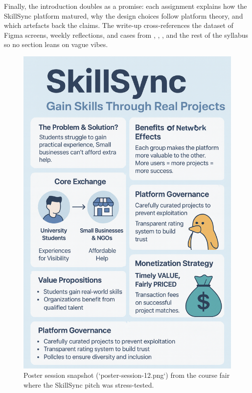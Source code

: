 \documentclass[12pt,a4paper]{article}
\begin{document}
Finally, the introduction doubles as a promise: each assignment explains how the SkillSync platform matured, why the design choices follow platform theory, and which artefacts back the claims. The write-up cross-references the dataset of Figma screens, weekly reflections, and cases from \citet{Choudary2016}, \citet{Srnicek2017}, \citet{Reillier2017}, and the rest of the syllabus so no section leans on vague vibes.

\begin{figure}[h]
  \centering
  \includegraphics[width=0.7\linewidth]{figures/poster-session-12.png}
  \caption{Poster session snapshot (`poster-session-12.png`) from the course fair where the SkillSync pitch was stress-tested.}
  \label{fig:intro-showcase}
\end{figure}












\newpage


\end{document}
